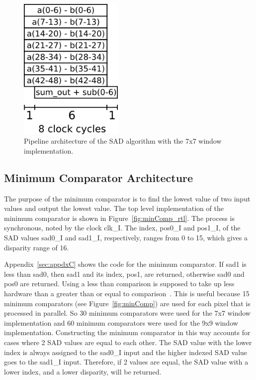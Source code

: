 \begin{figure}
	\begin{center}
		\includegraphics[width=50mm]{figures/sadPipeline7x7.png}
		\captionfonts
		\caption{Pipeline architecture of the SAD algorithm with the 7x7 window implementation.}
		\label{fig:sadPipe7x7}
	\end{center}
\end{figure}



\subsection{Minimum Comparator Architecture}

The purpose of the minimum comparator is to find the lowest value of two input values and output the lowest value. The top level implementation of the minimum comparator is shown in Figure~\ref{fig:minComp_rtl}. The process is synchronous, noted by the clock clk\_I. The index, pos0\_I and pos1\_I, of the SAD values sad0\_I and sad1\_I, respectively, ranges from 0 to 15, which gives a disparity range of 16. 

Appendix~\ref{sec:appdxC} shows the code for the minimum comparator. If sad1 is less than sad0, then sad1 and its index, pos1, are returned, otherwise sad0 and pos0 are returned. Using a less than comparison is supposed to take up less hardware than a greater than or equal to comparison~\cite{lessThan}. This is useful because 15 minimum comparators (see Figure~\ref{fig:minComp}) are used for each pixel that is processed in parallel. So 30 minimum comparators were used for the 7x7 window implementation and 60 minimum comparators were used for the 9x9 window implementation. Constructing the minimum comparator in this way accounts for cases where 2 SAD values are equal to each other. The SAD value with the lower index is always assigned to the sad0\_I input and the higher indexed SAD value goes to the sad1\_I input. Therefore, if 2 values are equal, the SAD value with a lower index, and a lower disparity, will be returned. %

